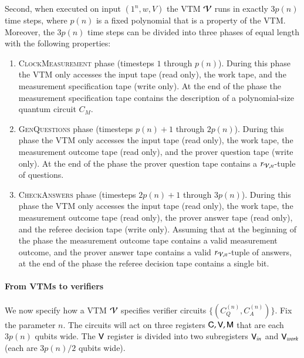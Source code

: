 Second, when executed on input $(1^n,w,V)$ the VTM $\mathcal V$ runs in exactly $3p(n)$ time steps, where $p(n)$ is a fixed polynomial that is a property of the VTM. Moreover, the $3p(n)$ time steps can be divided into three phases of equal length with the following properties: 
\begin{enumerate}
\item \textsc{ClockMeasurement} phase (timesteps $1$ through $p(n)$). During this phase the VTM only accesses the input tape (read only), the work tape, and the measurement specification tape (write only). At the end of the phase the measurement specification tape contains the description of a polynomial-size quantum circuit $C_M$.  
\item  \textsc{GenQuestions} phase (timesteps $p(n) +1$ through $2p(n)$). During this phase the VTM only accesses the input tape (read only), the work tape, the measurement outcome tape (read only), and the prover question tape (write only). At the end of the phase the prover question tape contains a $r_{\mathcal V,n}$-tuple of questions. 
\item \textsc{CheckAnswers} phase (timesteps $2p(n) + 1$ through $3p(n)$). During this phase the VTM only accesses the input tape (read only), the work tape, the measurement outcome tape (read only), the prover answer tape (read only), and the referee decision tape (write only). Assuming that at the beginning of the phase the measurement outcome tape contains a valid measurement outcome, and the prover answer tape contains a valid $r_{\mathcal V,n}$-tuple of answers, at the end of the phase the referee decision tape contains a single bit. 
\end{enumerate}

\paragraph{From VTMs to verifiers} We now specify how a VTM $\mathcal V$ specifies verifier circuits $\{ (C_Q^{(n)},C_A^{(n)}) \}$. Fix the parameter $n$. The circuits will act on three registers ${\mathsf{C}}, {\mathsf{V}}, {\mathsf{M}}$ that are each $3p(n)$ qubits wide. The ${\mathsf{V}}$ register is divided into two subregisters ${\mathsf{V}}_{in}$ and ${\mathsf{V}}_{work}$ (each are $3p(n)/2$ qubits wide). 


